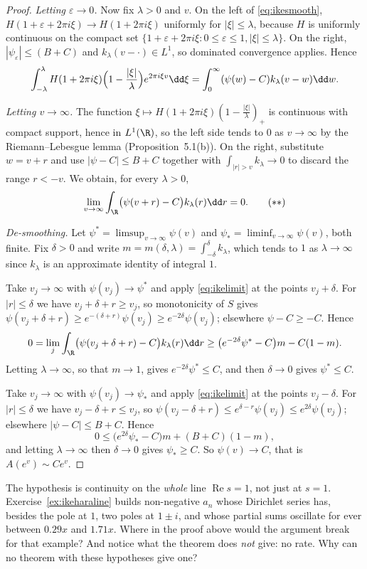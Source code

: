 \begin{proof}
\emph{Letting $\varepsilon\to0$.} Now fix $\lambda>0$ and $v$. On the left of \eqref{eq:ikesmooth}, $H(1+\varepsilon+2\pi i\xi)\to H(1+2\pi i\xi)$ uniformly for $|\xi|\le\lambda$,
because $H$ is uniformly continuous on the compact set $\{1+\varepsilon+2\pi i\xi:0\le\varepsilon\le1,|\xi|\le\lambda\}$. On the right, $|\psi_\varepsilon|\le(B+C)$ and
$k_\lambda(v-\cdot)\in L^1$, so dominated convergence applies. Hence
\[
\int_{-\lambda}^\lambda H(1+2\pi i\xi)\Bigl(1-\frac{|\xi|}\lambda\Bigr)e^{2\pi i\xi v}\dd\xi=\int_0^\infty(\psi(w)-C)k_\lambda(v-w)\dd w.
\]

\emph{Letting $v\to\infty$.} The function $\xi\mapsto H(1+2\pi i\xi)(1-\frac{|\xi|}\lambda)_+$ is continuous with compact support, hence in $L^1(\R)$, so the left
side tends to $0$ as $v\to\infty$ by the Riemann--Lebesgue lemma (Proposition~5.1(b)). On the right, substitute $w=v+r$ and use $|\psi-C|\le B+C$ together
with $\int_{|r|>v}k_\lambda\to0$ to discard the range $r<-v$. We obtain, for every $\lambda>0$,
\[
\lim_{v\to\infty}\int_\R\bigl(\psi(v+r)-C\bigr)k_\lambda(r)\dd r=0.\tag{$**$}\label{eq:ikelimit}
\]

\emph{De-smoothing.} Let $\psi^*=\limsup_{v\to\infty}\psi(v)$ and $\psi_*=\liminf_{v\to\infty}\psi(v)$, both finite. Fix $\delta>0$ and write
$m=m(\delta,\lambda)=\int_{-\delta}^\delta k_\lambda$, which tends to $1$ as $\lambda\to\infty$ since $k_\lambda$ is an approximate identity of integral $1$.

Take $v_j\to\infty$ with $\psi(v_j)\to\psi^*$ and apply \eqref{eq:ikelimit} at the points $v_j+\delta$. For $|r|\le\delta$ we have $v_j+\delta+r\ge v_j$, so
monotonicity of $S$ gives $\psi(v_j+\delta+r)\ge e^{-(\delta+r)}\psi(v_j)\ge e^{-2\delta}\psi(v_j)$; elsewhere $\psi-C\ge-C$. Hence
\[
0=\lim_j\int_\R\bigl(\psi(v_j+\delta+r)-C\bigr)k_\lambda(r)\dd r\ge\bigl(e^{-2\delta}\psi^*-C\bigr)m-C(1-m).
\]
Letting $\lambda\to\infty$, so that $m\to1$, gives $e^{-2\delta}\psi^*\le C$, and then $\delta\to0$ gives $\psi^*\le C$.

Take $v_j\to\infty$ with $\psi(v_j)\to\psi_*$ and apply \eqref{eq:ikelimit} at the points $v_j-\delta$. For $|r|\le\delta$ we have $v_j-\delta+r\le v_j$, so
$\psi(v_j-\delta+r)\le e^{\delta-r}\psi(v_j)\le e^{2\delta}\psi(v_j)$; elsewhere $|\psi-C|\le B+C$. Hence
\[
0\le\bigl(e^{2\delta}\psi_*-C\bigr)m+(B+C)(1-m),
\]
and letting $\lambda\to\infty$ then $\delta\to0$ gives $\psi_*\ge C$. So $\psi(v)\to C$, that is $A(e^v)\sim Ce^v$.
\end{proof}

\begin{think}
The hypothesis is continuity on the \emph{whole} line $\operatorname{Re}s=1$, not just at $s=1$. Exercise~\ref{ex:ikeharaline} builds non-negative $a_n$ whose
Dirichlet series has, besides the pole at $1$, two poles at $1\pm i$, and whose partial sums oscillate for ever between $0.29x$ and $1.71x$. Where in the
proof above would the argument break for that example? And notice what the theorem does \emph{not} give: no rate. Why can no theorem with these hypotheses
give one?
\end{think}

